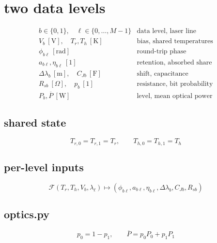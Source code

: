 \section*{two data levels}
\[
\begin{array}{ll}b\in\{0,1\},\quad\ell\in\{0,\ldots,M-1\}&\text{data level, laser line}\\[0.6em]V_b\ [\mathrm V],\quad T_r,T_h\ [\mathrm K]&\text{bias, shared temperatures}\\[0.6em]\phi_{b\ell}\ [\mathrm{rad}]&\text{round-trip phase}\\[0.6em]a_{b\ell},\eta_{b\ell}\ [1]&\text{retention, absorbed share}\\[0.6em]\Delta\lambda_b\ [\mathrm m],\quad C_{Jb}\ [\mathrm F]&\text{shift, capacitance}\\[0.6em]R_{sb}\ [\Omega],\quad p_b\ [1]&\text{resistance, bit probability}\\[0.6em]P_b,\overline P\ [\mathrm W]&\text{level, mean optical power}\end{array}
\]
\subsection*{shared state}
\[
\displaystyle T_{r,0}=T_{r,1}=T_r,\qquad T_{h,0}=T_{h,1}=T_h
\]
\subsection*{per-level inputs}
\[
\displaystyle \mathcal F(T_r,T_h,V_b,\lambda_\ell)\mapsto\left(\phi_{b\ell},a_{b\ell},\eta_{b\ell},\Delta\lambda_b,C_{Jb},R_{sb}\right)
\]
\subsection*{optics.py}
\[
\displaystyle p_0=1-p_1,\qquad\overline P=p_0P_0+p_1P_1
\]
